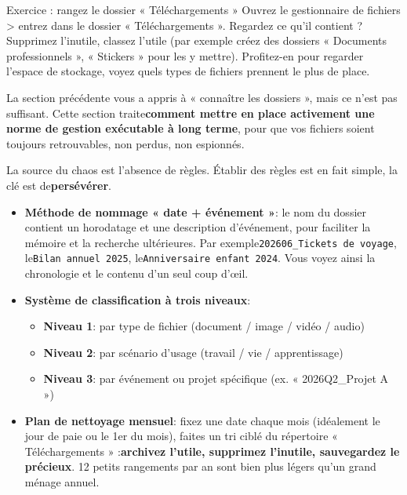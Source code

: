 \begin{tcbpractice}{Exercice : rangez le dossier « Téléchargements »}
Ouvrez le gestionnaire de fichiers > entrez dans le dossier « Téléchargements ». Regardez ce qu'il contient ? Supprimez l'inutile, classez l'utile (par exemple créez des dossiers « Documents professionnels », « Stickers » pour les y mettre). Profitez-en pour regarder l'espace de stockage, voyez quels types de fichiers prennent le plus de place.

\end{tcbpractice}


La section précédente vous a appris à « connaître les dossiers », mais ce n'est pas suffisant. Cette section traite\textbf{comment mettre en place activement une norme de gestion exécutable à long terme}, pour que vos fichiers soient toujours retrouvables, non perdus, non espionnés.


La source du chaos est l'absence de règles. Établir des règles est en fait simple, la clé est de\textbf{persévérer}.

\begin{itemize}
  \item \textbf{Méthode de nommage « date + événement »}: le nom du dossier contient un horodatage et une description d'événement, pour faciliter la mémoire et la recherche ultérieures. Par exemple\texttt{202606\_Tickets de voyage}, le\texttt{Bilan annuel 2025}, le\texttt{Anniversaire enfant 2024}. Vous voyez ainsi la chronologie et le contenu d'un seul coup d'œil.
  \item \textbf{Système de classification à trois niveaux}:
  \begin{itemize}
    \item \textbf{Niveau 1}: par type de fichier (document / image / vidéo / audio)
    \item \textbf{Niveau 2}: par scénario d'usage (travail / vie / apprentissage)
    \item \textbf{Niveau 3}: par événement ou projet spécifique (ex. « 2026Q2\_Projet A »)
  \end{itemize}
  \item \textbf{Plan de nettoyage mensuel}: fixez une date chaque mois (idéalement le jour de paie ou le 1er du mois), faites un tri ciblé du répertoire « Téléchargements » :\textbf{archivez l'utile, supprimez l'inutile, sauvegardez le précieux}. 12 petits rangements par an sont bien plus légers qu'un grand ménage annuel.
\end{itemize}

